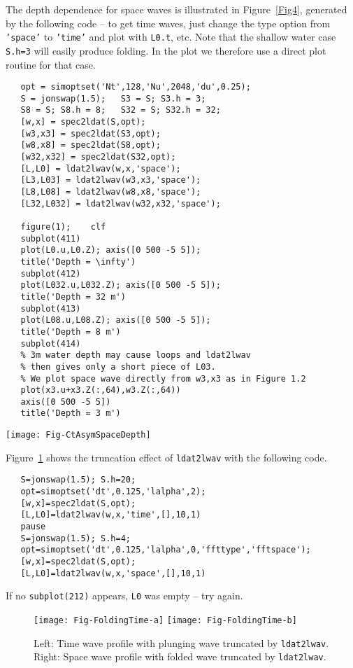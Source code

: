 The depth dependence for space waves is illustrated in Figure~\ref{Fig4},
generated by the following code -- to get time waves, just change the type option from {\tt 'space'}  to {\tt 'time'} and plot with {\tt L0.t}, etc. Note that the shallow water case {\tt S.h=3} will easily produce folding. In the plot we therefore use a direct plot routine for that case.
{\small\begin{verbatim}
   opt = simoptset('Nt',128,'Nu',2048,'du',0.25);
   S = jonswap(1.5);   S3 = S; S3.h = 3;
   S8 = S; S8.h = 8;   S32 = S; S32.h = 32;
   [w,x] = spec2ldat(S,opt);
   [w3,x3] = spec2ldat(S3,opt);
   [w8,x8] = spec2ldat(S8,opt);
   [w32,x32] = spec2ldat(S32,opt);
   [L,L0] = ldat2lwav(w,x,'space');
   [L3,L03] = ldat2lwav(w3,x3,'space');
   [L8,L08] = ldat2lwav(w8,x8,'space');
   [L32,L032] = ldat2lwav(w32,x32,'space');

   figure(1);    clf
   subplot(411)
   plot(L0.u,L0.Z); axis([0 500 -5 5]);
   title('Depth = \infty')
   subplot(412)
   plot(L032.u,L032.Z); axis([0 500 -5 5]);
   title('Depth = 32 m')
   subplot(413)
   plot(L08.u,L08.Z); axis([0 500 -5 5]);
   title('Depth = 8 m')
   subplot(414)
   % 3m water depth may cause loops and ldat2lwav
   % then gives only a short piece of L03.
   % We plot space wave directly from w3,x3 as in Figure 1.2
   plot(x3.u+x3.Z(:,64),w3.Z(:,64))
   axis([0 500 -5 5])
   title('Depth = 3 m')
\end{verbatim}
}

 \begin{SCfigure}[1][t]
\texttt{[image: Fig-CtAsymSpaceDepth]}
\caption{Crest-trough asymmetric Lagrange space wave on different water depth.}
\label{Fig4}
\end{SCfigure}

\noindent
Figure~\ref{Fig4b}  shows the truncation effect of {\tt ldat2lwav} with the following code.
{\small\begin{verbatim}
   S=jonswap(1.5); S.h=20;
   opt=simoptset('dt',0.125,'lalpha',2);
   [w,x]=spec2ldat(S,opt);
   [L,L0]=ldat2lwav(w,x,'time',[],10,1)
   pause
   S=jonswap(1.5); S.h=4;
   opt=simoptset('dt',0.125,'lalpha',0,'ffttype','fftspace');
   [w,x]=spec2ldat(S,opt);
   [L,L0]=ldat2lwav(w,x,'space',[],10,1)
\end{verbatim}
}
\noindent
If no {\tt subplot(212)} appears, {\tt L0} was empty -- try again.

\begin{figure}
\centerline{
\texttt{[image: Fig-FoldingTime-a]}
\texttt{[image: Fig-FoldingTime-b]}
}
\caption{Left: Time wave profile with plunging wave truncated by {\tt ldat2lwav}.
Right: Space wave profile with folded wave truncated by {\tt ldat2lwav}.}
\label{Fig4b}
\end{figure}

